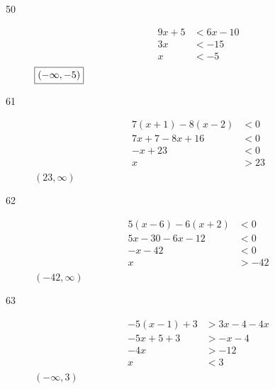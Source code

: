 \documentclass[letterpaper]{exam}
\begin{document}
\begin{description}
      \item[50]
        \begin{align*}
          9x + 5 & < 6x - 10 \\
          3x     & < -15 \\
          x      & < -5 \\
        \end{align*}
        $\boxed{ \intoo{ -\infty, -5 } }$


      \item[61]
        \begin{align*}
          7(x + 1) - 8(x - 2) & < 0 \\
          7x + 7 - 8x + 16    & < 0 \\
          -x + 23             & < 0 \\
          x                   & > 23 \\
        \end{align*}
        $\boxed{ (23, \infty) }$

      \item[62]
        \begin{align*}
          5(x - 6) -6(x + 2) & < 0 \\
          5x - 30 - 6x -12   & < 0 \\
          -x - 42            & < 0 \\
          x                  & > -42 \\
        \end{align*}
        $\boxed{ (-42, \infty) }$

      \item[63]
        \begin{align*}
          -5(x - 1) + 3 & > 3x - 4 -4x \\
          -5x + 5 + 3   & > -x - 4 \\
          -4x           & > -12 \\
          x             & < 3 \\
        \end{align*}
        $\boxed{ (-\infty, 3) }$


\end{description}
\end{document}
